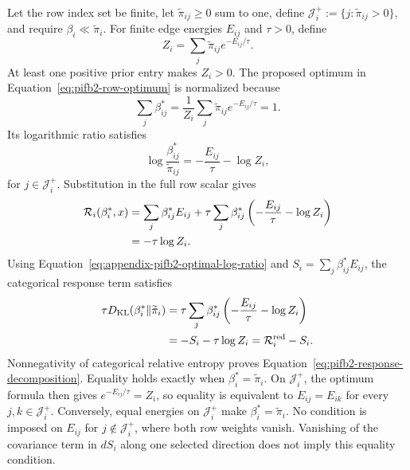 Let the row index set be finite, let \(\widetilde\pi_{ij}\geq0\) sum to one, define \(\mathcal J_i^+:=\{j:\widetilde\pi_{ij}>0\}\), and require \(\beta_i\ll\widetilde\pi_i\). For finite edge energies \(E_{ij}\) and \(\tau>0\), define
\begin{equation}
Z_i=\sum_j\widetilde\pi_{ij}e^{-E_{ij}/\tau}.
\label{eq:appendix-pifb2-row-partition}
\end{equation}
At least one positive prior entry makes \(Z_i>0\). The proposed optimum in Equation~\eqref{eq:pifb2-row-optimum} is normalized because
\begin{equation}
\sum_j\beta_{ij}^*
=\frac{1}{Z_i}\sum_j\widetilde\pi_{ij}e^{-E_{ij}/\tau}
=1.
\label{eq:appendix-pifb2-beta-normalization}
\end{equation}
Its logarithmic ratio satisfies
\begin{equation}
\log\frac{\beta_{ij}^*}{\widetilde\pi_{ij}}
=-\frac{E_{ij}}{\tau}-\log Z_i,
\label{eq:appendix-pifb2-optimal-log-ratio}
\end{equation}
for \(j\in\mathcal J_i^+\). Substitution in the full row scalar gives
\begin{align}
\mathcal R_i(\beta_i^*,x)
&=\sum_j\beta_{ij}^*E_{ij}
+\tau\sum_j\beta_{ij}^*
\left(-\frac{E_{ij}}{\tau}-\log Z_i\right)
\notag\\
&=-\tau\log Z_i.
\label{eq:appendix-pifb2-row-envelope-substitution}
\end{align}
Using Equation~\eqref{eq:appendix-pifb2-optimal-log-ratio} and \(S_i=\sum_j\beta_{ij}^*E_{ij}\), the categorical response term satisfies
\begin{align}
\tau D_{\mathrm{KL}}(\beta_i^*\Vert\widetilde\pi_i)
&=\tau\sum_j\beta_{ij}^*
\left(-\frac{E_{ij}}{\tau}-\log Z_i\right)\notag\\
&=-S_i-\tau\log Z_i
=\mathcal R_i^{\mathrm{red}}-S_i.
\label{eq:appendix-pifb2-response-decomposition}
\end{align}
Nonnegativity of categorical relative entropy proves Equation~\eqref{eq:pifb2-response-decomposition}. Equality holds exactly when \(\beta_i^*=\widetilde\pi_i\). On \(\mathcal J_i^+\), the optimum formula then gives \(e^{-E_{ij}/\tau}=Z_i\), so equality is equivalent to \(E_{ij}=E_{ik}\) for every \(j,k\in\mathcal J_i^+\). Conversely, equal energies on \(\mathcal J_i^+\) make \(\beta_i^*=\widetilde\pi_i\). No condition is imposed on \(E_{ij}\) for \(j\notin\mathcal J_i^+\), where both row weights vanish. Vanishing of the covariance term in \(dS_i\) along one selected direction does not imply this equality condition.

